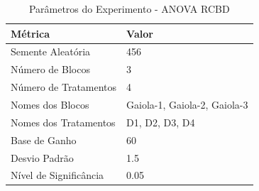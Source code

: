 \begin{table}[H]
\centering
\caption{Parâmetros do Experimento - ANOVA RCBD}
\label{tab:parametros_rcbd}
\begin{tabular}{lp{8cm}}
\toprule
Métrica & Valor \\
\midrule
Semente Aleatória & 456 \\
Número de Blocos & 3 \\
Número de Tratamentos & 4 \\
Nomes dos Blocos & Gaiola-1, Gaiola-2, Gaiola-3 \\
Nomes dos Tratamentos & D1, D2, D3, D4 \\
Base de Ganho & 60 \\
Desvio Padrão & 1.5 \\
Nível de Significância & 0.05 \\
\bottomrule
\end{tabular}
\end{table}
